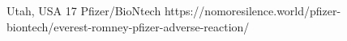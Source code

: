           {
            Utah, USA
          }
          {
            17
          }
          {
            Pfizer/BioNtech
          }
          {
          }
          {
          }
          {
            https://nomoresilence.world/pfizer-biontech/everest-romney-pfizer-adverse-reaction/
          }

